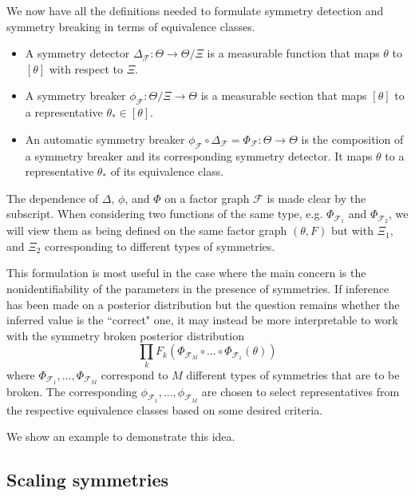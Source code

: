 We now have all the definitions needed to formulate symmetry detection and symmetry breaking in terms of equivalence classes.
\begin{itemize}

\item
A symmetry detector $\Delta_\mathcal{F}:\Theta\rightarrow\Theta/\Xi$ is a measurable function that maps $\theta$ to $[\theta]$ with respect to $\Xi$.

\item
A symmetry breaker $\phi_\mathcal{F}:\Theta/\Xi\rightarrow\Theta$ is a measurable section that maps $[\theta]$ to a representative $\theta_*\in[\theta]$.

\item
An automatic symmetry breaker $\phi_\mathcal{F}\circ\Delta_\mathcal{F}=\Phi_\mathcal{F}:\Theta\rightarrow\Theta$ is the composition of a symmetry breaker and its corresponding symmetry detector. It maps $\theta$ to a representative $\theta_*$ of its equivalence class.

\end{itemize}

The dependence of $\Delta$, $\phi$, and $\Phi$ on a factor graph $\mathcal{F}$ is made clear by the subscript. When considering two functions of the same type, e.g. $\Phi_{\mathcal{F}_1}$ and $\Phi_{\mathcal{F}_2}$, we will view them as being defined on the same factor graph $(\theta,F)$ but with $\Xi_1,$ and $\Xi_2$ corresponding to different types of symmetries.

This formulation is most useful in the case where the main concern is the nonidentifiability of the parameters in the presence of symmetries. If inference has been made on a posterior distribution but the question remains whether the inferred value is the ``correct" one, it may instead be more interpretable to work with the symmetry broken posterior distribution
\[
\prod_kF_k(\Phi_{\mathcal{F}_M}\circ ...\circ\Phi_{\mathcal{F}_1}(\theta))
\]
where $\Phi_{\mathcal{F}_1},...,\Phi_{\mathcal{F}_M}$ correspond to $M$ different types of symmetries that are to be broken. The corresponding $\phi_{\mathcal{F}_1},...,\phi_{\mathcal{F}_M}$ are chosen to select representatives from the respective equivalence classes based on some desired criteria.

We show an example to demonstrate this idea.


\subsection{Scaling symmetries}

